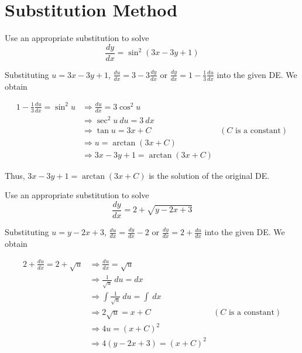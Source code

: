 \section{Substitution Method}

\begin{example}
    Use an appropriate substitution to solve 
    \[
        \frac{dy}{dx} = \sin^2(3x-3y+1)
    \]
\end{example}
\begin{solution}
    Substituting $u = 3x - 3y +1$, $\frac{du}{dx} = 3 - 3\frac{dy}{dx}$ 
    or $\frac{dy}{dx} = 1 - \frac{1}{3} \frac{du}{dx}$ into the given DE. We obtain 

    \begin{align*}
        1 - \frac{1}{3} \frac{du}{dx} = \sin^2 u &\Rightarrow \frac{du}{dx} = 3 \cos^2 u\\
        &\Rightarrow \sec^2 u \>du = 3\>dx\\
        &\Rightarrow \tan u = 3x + C & (C \text{ is a constant})\\
        &\Rightarrow u = \arctan(3x + C)\\
        &\Rightarrow 3x - 3y +1 = \arctan(3x + C)
    \end{align*}
\end{solution}

Thus, $3x - 3y +1 = \arctan(3x + C)$ is the solution of the original DE.

\begin{example}
    Use an appropriate substitution to solve 
    \[
        \frac{dy}{dx} = 2 + \sqrt{y - 2x + 3}
    \]
\end{example}
\begin{solution}
    Substituting $u = y - 2x + 3$, $\frac{du}{dx} = \frac{dy}{dx} - 2$ 
    or $\frac{dy}{dx} = 2 + \frac{du}{dx}$ into the given DE. We obtain 

    \begin{align*}
        2 + \frac{du}{dx} = 2 + \sqrt{u} &\Rightarrow \frac{du}{dx} = \sqrt{u}\\
        &\Rightarrow \frac{1}{\sqrt{u}} \>du = dx\\
        &\Rightarrow \int \frac{1}{\sqrt{u}} \>du = \int \> dx\\
        &\Rightarrow 2 \sqrt{u} = x + C & (C \text{ is a constant})\\
        &\Rightarrow 4u = (x + C)^2\\
        &\Rightarrow 4(y - 2x + 3) = (x + C)^2
    \end{align*}
\end{solution}


